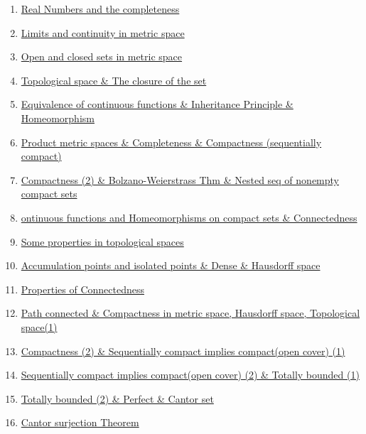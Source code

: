 \documentclass[11pt]{article}
\begin{document}
\begin{enumerate}
	\item	\href{https://mp.weixin.qq.com/s/bRlM1D6w81x8vi86ZuEzWg}{Real Numbers and the completeness}	%
	\item	\href{https://mp.weixin.qq.com/s/hL4R9oVPgLutPdHZ7OLPqA}{Limits and continuity in metric space}	%
	\item	\href{https://mp.weixin.qq.com/s/Vn2QaB4YH0syKCEP9RDU-w}{Open and closed sets in metric space} 	%
	\item 	\href{https://mp.weixin.qq.com/s/cGzpf5SMo_rp7r-NoGdTLA}{Topological space \& The closure of the set}	%
	\item 	\href{https://mp.weixin.qq.com/s/BeW60DhwiObcZZojUMW1SA}{Equivalence of continuous functions \& Inheritance Principle \& Homeomorphism}	%
	\item 	\href{https://mp.weixin.qq.com/s/RHyS3GBYo60sRzWqn8EJAA}{Product metric spaces \& Completeness \& Compactness (sequentially compact)}	%
	\item 	\href{https://mp.weixin.qq.com/s/CDRp8y0ENUFoTiSQxqJVCA}{Compactness (2) \& Bolzano-Weierstrass Thm \& Nested seq of nonempty compact sets}	%
	\item 	\href{https://mp.weixin.qq.com/s/msGuGyEvq2NrE7SuZJw6Qw}{ontinuous functions and Homeomorphisms on compact sets \& Connectedness}	%
	\item 	\href{https://mp.weixin.qq.com/s/buCGMGHcmv3BNfHYAV4Yog}{Some properties in topological spaces}	%
	\item 	\href{https://mp.weixin.qq.com/s/OMz4s3muR30OcT0tgPF0Fg}{Accumulation points and isolated points \& Dense \& Hausdorff space}	%
	\item	\href{https://mp.weixin.qq.com/s/1M72FTwknBXv7-kJ2robdQ}{Properties of Connectedness}	%
	\item	\href{https://mp.weixin.qq.com/s/6eiS57UPiaBmysPVT5azRA}{Path connected \& Compactness in metric space, Hausdorff space, Topological space(1)}	%
	\item	\href{https://mp.weixin.qq.com/s/XJZS0LKhSQ1LKiBe_QpulA}{Compactness (2) \& Sequentially compact implies compact(open cover) (1)} 	%
	\item 	\href{https://mp.weixin.qq.com/s/lCXe3Ra_E7_WUYN7m_E-cw}{Sequentially compact implies compact(open cover) (2) \& Totally bounded (1)}	%
	\item 	\href{https://mp.weixin.qq.com/s/-KG6ZBaSu08D9_zx9K02dQ}{Totally bounded (2) \& Perfect \& Cantor set}	%
	\item 	\href{https://mp.weixin.qq.com/s/PUb16hKtrIQWF25eElY7kA}{Cantor surjection Theorem}	%

\end{enumerate}
\end{document}
